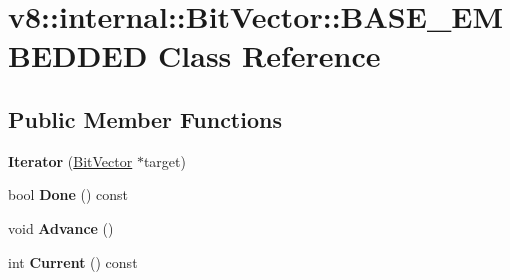 \hypertarget{classv8_1_1internal_1_1_bit_vector_1_1_b_a_s_e___e_m_b_e_d_d_e_d}{}\section{v8\+:\+:internal\+:\+:Bit\+Vector\+:\+:B\+A\+S\+E\+\_\+\+E\+M\+B\+E\+D\+D\+ED Class Reference}
\label{classv8_1_1internal_1_1_bit_vector_1_1_b_a_s_e___e_m_b_e_d_d_e_d}
\subsection*{Public Member Functions}
\begin{DoxyCompactItemize}
\item 
{\bfseries Iterator} (\hyperlink{classv8_1_1internal_1_1_bit_vector}{Bit\+Vector} $\ast$target)\hypertarget{classv8_1_1internal_1_1_bit_vector_1_1_b_a_s_e___e_m_b_e_d_d_e_d_adaf9ef5c42e0c648c060f8ab3e4235c3}{}\label{classv8_1_1internal_1_1_bit_vector_1_1_b_a_s_e___e_m_b_e_d_d_e_d_adaf9ef5c42e0c648c060f8ab3e4235c3}

\item 
bool {\bfseries Done} () const \hypertarget{classv8_1_1internal_1_1_bit_vector_1_1_b_a_s_e___e_m_b_e_d_d_e_d_ae6988869cfebb29b17c07bfcb65c1694}{}\label{classv8_1_1internal_1_1_bit_vector_1_1_b_a_s_e___e_m_b_e_d_d_e_d_ae6988869cfebb29b17c07bfcb65c1694}

\item 
void {\bfseries Advance} ()\hypertarget{classv8_1_1internal_1_1_bit_vector_1_1_b_a_s_e___e_m_b_e_d_d_e_d_a03c56bde179c06cec962c2cb05eaa08b}{}\label{classv8_1_1internal_1_1_bit_vector_1_1_b_a_s_e___e_m_b_e_d_d_e_d_a03c56bde179c06cec962c2cb05eaa08b}

\item 
int {\bfseries Current} () const \hypertarget{classv8_1_1internal_1_1_bit_vector_1_1_b_a_s_e___e_m_b_e_d_d_e_d_a8297bcf5e98da19cb8b3de091f85838b}{}\label{classv8_1_1internal_1_1_bit_vector_1_1_b_a_s_e___e_m_b_e_d_d_e_d_a8297bcf5e98da19cb8b3de091f85838b}

\end{DoxyCompactItemize}
